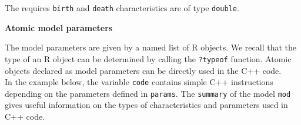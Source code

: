 \begin{Shaded}
\begin{Highlighting}[]
\StringTok{ }\OperatorTok{::}\OperatorTok{$}
\end{Highlighting}
\end{Shaded}

The requires \texttt{birth} and \texttt{death} characteristics are of type \texttt{double}.

\textbf{Atomic model parameters}

The model parameters are given by a named list of R objects. We recall that the type of an R object can be determined by calling the \texttt{?typeof} function. Atomic objects declared as model parameters can be directly used in the C++ code.\\
In the example below, the variable \texttt{code} contains simple C++ instructions depending on the parameters defined in \texttt{params}. The \texttt{summary} of the model \texttt{mod} gives useful information on the types of characteristics and parameters used in C++ code.

